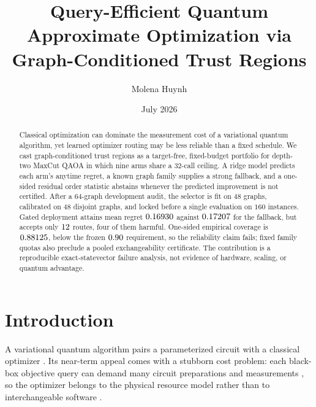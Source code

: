 \documentclass[aps,prx,reprint,superscriptaddress,floatfix]{revtex4-2}
\begin{document}
\title{Query-Efficient Quantum Approximate Optimization
via Graph-Conditioned Trust Regions}
\author{Molena Huynh}
\date{July 2026}

\begin{abstract}
Classical optimization can dominate the measurement cost of a variational
quantum algorithm, yet learned optimizer routing may be less reliable than a
fixed schedule.  We cast graph-conditioned trust regions as a target-free,
fixed-budget portfolio for depth-two MaxCut QAOA in which nine arms share a
$32$-call ceiling.  A ridge model predicts each arm's anytime regret, a known
graph family supplies a strong fallback, and a one-sided residual order
statistic abstains whenever the predicted improvement is not certified.  After a
$64$-graph development audit, the selector is fit on $48$ graphs, calibrated on
$48$ disjoint graphs, and locked before a single evaluation on $160$ instances.
Gated deployment attains mean regret $0.16930$ against
$0.17207$ for the fallback, but accepts only $12$
routes, four of them harmful.  One-sided empirical coverage is
$0.88125$, below the frozen $0.90$ requirement, so the
reliability claim fails; fixed family quotas also preclude a pooled
exchangeability certificate.  The contribution is a reproducible
exact-statevector failure analysis, not evidence of hardware, scaling, or
quantum advantage.
\end{abstract}
\maketitle

\section{Introduction}

A variational quantum algorithm pairs a parameterized circuit with a classical
optimizer \citep{peruzzo2014variational,mcclean2016theory}.  Its near-term
appeal comes with a stubborn cost problem: each black-box objective query can
demand many circuit preparations and measurements
\citep{preskill2018quantum,bharti2022noisy}, so the optimizer belongs to the
physical resource model rather than to interchangeable software
\citep{cerezo2021variational}.
\end{document}
